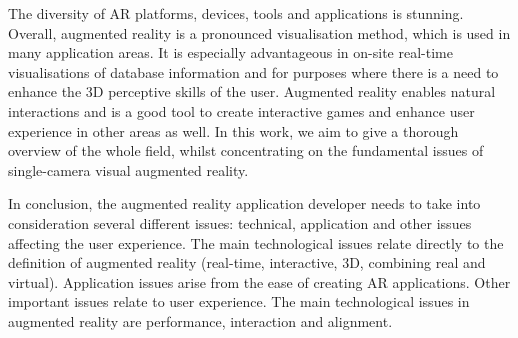 The diversity of AR platforms, devices, tools and applications is stunning. Overall, augmented reality is a pronounced visualisation method, which is used in many application areas. It is especially advantageous in on-site real-time visualisations of database information and for purposes where there is a need to enhance the 3D perceptive skills of the user. Augmented reality enables natural interactions and is a good tool to create interactive games and enhance user experience in other areas as well. In this work, we aim to give a thorough overview of the whole field, whilst concentrating on the fundamental issues of single-camera visual augmented reality.


In conclusion, the augmented reality application developer needs to take into consideration several different issues: technical, application and other issues affecting the user experience. The main technological issues relate directly to the definition of augmented reality (real-time, interactive, 3D, combining real and virtual). Application issues arise from the ease of creating AR applications. Other important issues relate to user experience. The main technological issues in augmented reality are performance, interaction and alignment.

